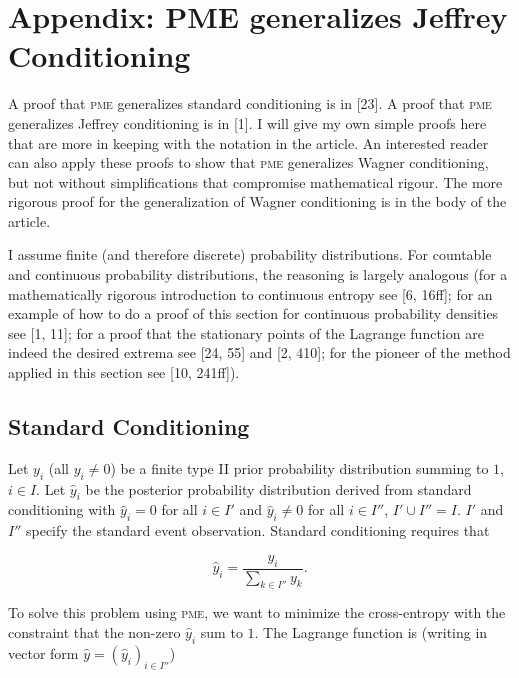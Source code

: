 \section{Appendix: PME generalizes Jeffrey Conditioning}
\label{appendix}

A proof that \textsc{pme} generalizes standard conditioning is in
[23]. A proof that \textsc{pme} generalizes Jeffrey conditioning is in
[1]. I will give my own simple proofs here that are more in keeping
with the notation in the article. An interested reader can also apply
these proofs to show that \textsc{pme} generalizes Wagner
conditioning, but not without simplifications that compromise
mathematical rigour. The more rigorous proof for the generalization of
Wagner conditioning is in the body of the article.

I assume finite (and therefore discrete) probability distributions.
For countable and continuous probability distributions, the reasoning
is largely analogous (for a mathematically rigorous introduction to
continuous entropy see [6, 16ff]; for an example of how to do a proof
of this section for continuous probability densities see [1, 11]; for
a proof that the stationary points of the Lagrange function are indeed
the desired extrema see [24, 55] and [2, 410]; for the pioneer of the
method applied in this section see [10, 241ff]).

\subsection{Standard Conditioning}
\label{sc}

Let $y_{i}$ (all $y_{i}\neq{}0$) be a finite type II prior probability
distribution summing to $1$, $i\in{}I$. Let $\hat{y}_{i}$ be the
posterior probability distribution derived from standard conditioning
with $\hat{y}_{i}=0$ for all $i\in{}I'$ and $\hat{y}_{i}\neq{}0$ for
all $i\in{}I''$, $I'\cup{}I''=I$. $I'$ and $I''$ specify the standard
event observation. Standard conditioning requires that

\begin{equation}
  \label{eq:sc}
  \hat{y}_{i}=\frac{y_{i}}{\sum_{k\in{}I''}y_{k}}.
\end{equation}

{\noindent}To solve this problem using \textsc{pme}, we want to minimize the
cross-entropy with the constraint that the non-zero $\hat{y}_{i}$ sum to
$1$. The Lagrange function is (writing in vector form
$\hat{y}=(\hat{y}_{i})_{i\in{}I''}$)

